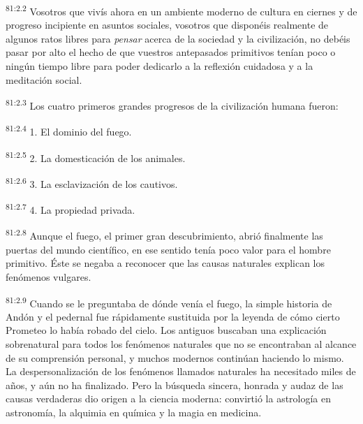 \documentclass[twoside, 11pt]{book}
\begin{document}
\par
\textsuperscript{81:2.2} Vosotros que vivís ahora en un ambiente moderno de cultura en ciernes y de progreso incipiente en asuntos sociales, vosotros que disponéis realmente de algunos ratos libres para \textit{pensar} acerca de la sociedad y la civilización, no debéis pasar por alto el hecho de que vuestros antepasados primitivos tenían poco o ningún tiempo libre para poder dedicarlo a la reflexión cuidadosa y a la meditación social.

\par
\textsuperscript{81:2.3} Los cuatro primeros grandes progresos de la civilización humana fueron:

\par
\textsuperscript{81:2.4} 1. El dominio del fuego.

\par
\textsuperscript{81:2.5} 2. La domesticación de los animales.

\par
\textsuperscript{81:2.6} 3. La esclavización de los cautivos.

\par
\textsuperscript{81:2.7} 4. La propiedad privada.

\par
\textsuperscript{81:2.8} Aunque el fuego, el primer gran descubrimiento, abrió finalmente las puertas del mundo científico, en ese sentido tenía poco valor para el hombre primitivo. Éste se negaba a reconocer que las causas naturales explican los fenómenos vulgares.

\par
\textsuperscript{81:2.9} Cuando se le preguntaba de dónde venía el fuego, la simple historia de Andón y el pedernal fue rápidamente sustituida por la leyenda de cómo cierto Prometeo lo había robado del cielo. Los antiguos buscaban una explicación sobrenatural para todos los fenómenos naturales que no se encontraban al alcance de su comprensión personal, y muchos modernos continúan haciendo lo mismo. La despersonalización de los fenómenos llamados naturales ha necesitado miles de años, y aún no ha finalizado. Pero la búsqueda sincera, honrada y audaz de las causas verdaderas dio origen a la ciencia moderna: convirtió la astrología en astronomía, la alquimia en química y la magia en medicina.
\end{document}
